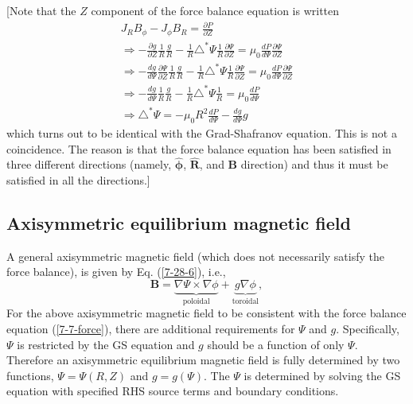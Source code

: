\documentclass{llncs}
\newcommand{\tmmathbf}[1]{\ensuremath{\boldsymbol{#1}}}
\newcommand{\tmop}[1]{\ensuremath{\operatorname{#1}}}
\begin{document}
[Note that the $Z$ component of the force balance equation is written
\[ \begin{array}{l}
     J_R B_{\phi} - J_{\phi} B_R = \frac{\partial P}{\partial Z}\\
     \Rightarrow - \frac{\partial g}{\partial Z} \frac{1}{R} \frac{g}{R} -
     \frac{1}{R} \triangle^{\ast} \Psi \frac{1}{R} \frac{\partial
     \Psi}{\partial Z} = \mu_0 \frac{d P}{d \Psi} \frac{\partial
     \Psi}{\partial Z}\\
     \Rightarrow - \frac{d g}{d \Psi} \frac{\partial \Psi}{\partial Z}
     \frac{1}{R} \frac{g}{R} - \frac{1}{R} \triangle^{\ast} \Psi \frac{1}{R}
     \frac{\partial \Psi}{\partial Z} = \mu_0 \frac{d P}{d \Psi}
     \frac{\partial \Psi}{\partial Z}\\
     \Rightarrow - \frac{d g}{d \Psi} \frac{1}{R} \frac{g}{R} - \frac{1}{R}
     \triangle^{\ast} \Psi \frac{1}{R} = \mu_0 \frac{d P}{d \Psi}\\
     \Rightarrow \triangle^{\ast} \Psi = - \mu_0 R^2 \frac{d P}{d \Psi} -
     \frac{d g}{d \Psi} g
   \end{array} \]
which turns out to be identical with the Grad-Shafranov equation. This is not
a coincidence. The reason is that the force balance equation has been
satisfied in three different directions (namely, $\hat{\tmmathbf{\phi}}$,
$\hat{\mathbf{R}}$, and $\mathbf{B}$ direction) and thus it must be satisfied
in all the directions.]

\subsection{Axisymmetric equilibrium magnetic field}

A general axisymmetric magnetic field (which does not necessarily satisfy the
force balance), is given by Eq. (\ref{7-28-6}), i.e.,
\begin{equation}
  \label{4-15-p3} \mathbf{B}= \underbrace{\nabla \Psi \times \nabla
  \phi}_{\tmop{poloidal}} + \underbrace{g \nabla \phi}_{\tmop{toroidal}},
\end{equation}
For the above axisymmetric magnetic field to be consistent with the force
balance equation (\ref{7-7-force}), there are additional requirements for
$\Psi$ and $g$. Specifically, $\Psi$ is restricted by the GS equation and $g$
should be a function of only $\Psi$. Therefore an axisymmetric equilibrium
magnetic field is fully determined by two functions, $\Psi = \Psi (R, Z)$ and
$g = g (\Psi)$. The $\Psi$ is determined by solving the GS equation with
specified RHS source terms and boundary conditions.
\end{document}
